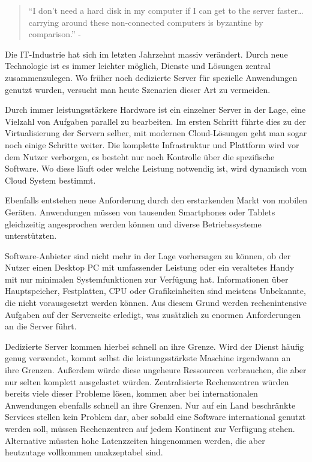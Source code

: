 \begin{quotation}
	``I don’t need a hard disk in my computer if I can get to the server faster… carrying around these non-connected computers is byzantine by comparison.'' - \parencite{jobs.1997}
\end{quotation}

Die IT-Industrie hat sich im letzten Jahrzehnt massiv verändert. Durch neue Technologie ist es immer leichter möglich, Dienste und Lösungen zentral zusammenzulegen. Wo früher noch dedizierte Server für spezielle Anwendungen genutzt wurden, versucht man heute Szenarien dieser Art zu vermeiden.

Durch immer leistungsstärkere Hardware ist ein einzelner Server in der Lage, eine Vielzahl von Aufgaben parallel zu bearbeiten. Im ersten Schritt führte dies zu der Virtualisierung der Servern selber, mit modernen Cloud-Lösungen geht man sogar noch einige Schritte weiter. Die komplette Infrastruktur und Plattform wird vor dem Nutzer verborgen, es besteht nur noch Kontrolle über die spezifische Software. Wo diese läuft oder welche Leistung notwendig ist, wird dynamisch vom Cloud System bestimmt.

Ebenfalls entstehen neue Anforderung durch den erstarkenden Markt von mobilen Geräten. Anwendungen müssen von tausenden Smartphones oder Tablets gleichzeitig angesprochen werden können und diverse Betriebssysteme unterstützten. 

Software-Anbieter sind nicht mehr in der Lage vorhersagen zu können, ob der Nutzer einen Desktop PC mit umfassender Leistung oder ein veraltetes Handy mit nur minimalen Systemfunktionen zur Verfügung hat. Informationen über Hauptspeicher, Festplatten, CPU oder Grafikeinheiten sind meistens Unbekannte, die nicht vorausgesetzt werden können. Aus diesem Grund werden rechenintensive Aufgaben auf der Serverseite erledigt, was zusätzlich zu enormen Anforderungen an die Server führt.

Dedizierte Server kommen hierbei schnell an ihre Grenze. Wird der Dienst häufig genug verwendet, kommt selbst die leistungsstärkste Maschine irgendwann an ihre Grenzen. Außerdem würde diese ungeheure Ressourcen verbrauchen, die aber nur selten komplett ausgelastet würden. 
Zentralisierte Rechenzentren würden bereits viele dieser Probleme lösen, kommen aber bei internationalen Anwendungen ebenfalls schnell an ihre Grenzen. Nur auf ein Land beschränkte Services stellen kein Problem dar, aber sobald eine Software international genutzt werden soll, müssen Rechenzentren auf jedem Kontinent zur Verfügung stehen. Alternative müssten hohe Latenzzeiten hingenommen werden, die aber heutzutage vollkommen unakzeptabel sind.

